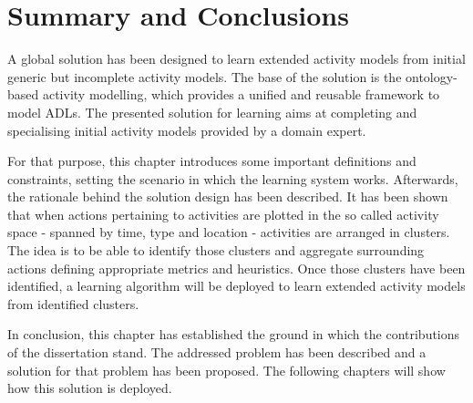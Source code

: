 \section{Summary and Conclusions}
\label{sec:approach:sum}

A global solution has been designed to learn extended activity models from initial generic but incomplete activity models. The base of the solution is the ontology-based activity modelling, which provides a unified and reusable framework to model ADLs. The presented solution for learning aims at completing and specialising initial activity models provided by a domain expert. 

For that purpose, this chapter introduces some important definitions and constraints, setting the scenario in which the learning system works. Afterwards, the rationale behind the solution design has been described. It has been shown that when actions pertaining to activities are plotted in the so called activity space - spanned by time, type and location - activities are arranged in clusters. The idea is to be able to identify those clusters and aggregate surrounding actions defining appropriate metrics and heuristics. Once those clusters have been identified, a learning algorithm will be deployed to learn extended activity models from identified clusters.

In conclusion, this chapter has established the ground in which the contributions of the dissertation stand. The addressed problem has been described and a solution for that problem has been proposed. The following chapters will show how this solution is deployed.
